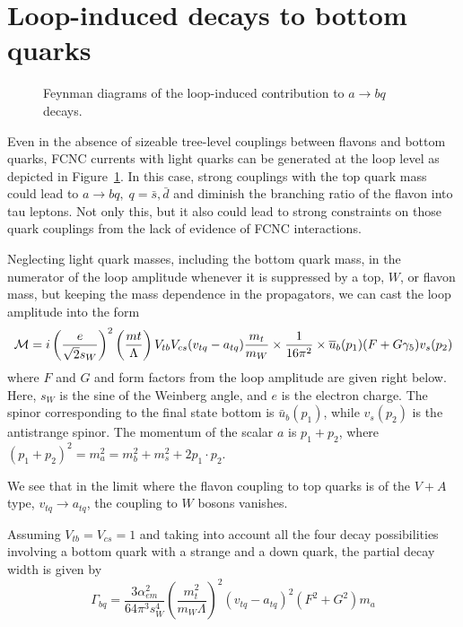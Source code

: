 \documentclass[prd,amsfonts,onecolumn,superscriptaddress,aps,nofootinbib,11pt]{revtex4-1}
\begin{document}
\section{Loop-induced decays to bottom quarks}
\label{app:loop}
\begin{figure}
    \centering
    
    \caption{Feynman diagrams of the loop-induced contribution to $a\to bq$ decays.}
    \label{fig:loop-tikz}
\end{figure}

 Even in the absence of sizeable tree-level couplings between flavons and bottom quarks, FCNC currents with light quarks can be generated at the loop level as depicted in Figure~\ref{fig:loop-tikz}. In this case, strong couplings with the top quark mass could lead to $a\to bq,\; q=\bar{s},\bar{d}$ and diminish the branching ratio of the flavon into tau leptons. Not only this, but it also could lead to strong constraints on those quark couplings from the lack of evidence of FCNC interactions. 

 Neglecting light quark masses, including the bottom quark mass, in the numerator of the loop amplitude whenever it is suppressed by a top, $W$, or flavon mass, but keeping the mass dependence in the propagators, we can cast the loop amplitude into the form
 \begin{equation}
     {\cal M} = i\left(\frac{e}{\sqrt{2} s_W}\right)^2\left(\frac{mt}{\Lambda}\right) V_{tb} V_{cs} (v_{tq}-a_{tq})\frac{m_t}{m_W}\times \frac{1}{16\pi^2}\times \overline{u}_b(p_1)(F+G\gamma_5)v_s(p_2)
 \end{equation}
 where $F$ and $G$ and form factors from the loop amplitude are given right below. Here, $s_W$ is the sine of the Weinberg angle, and $e$ is the electron charge. The spinor corresponding to the final state bottom is $\bar{u}_b(p_1)$, while $v_s(p_2)$ is the antistrange spinor. The momentum of the scalar $a$ is $p_1+p_2$, where $(p_1+p_2)^2=m_a^2=m_b^2+m_s^2+2p_1\cdot p_2$.

 We see that in the limit where the flavon coupling to top quarks is of the $V+A$ type, $v_{tq}\to a_{tq}$, the coupling to $W$ bosons vanishes. 

 Assuming $V_{tb}=V_{cs}=1$ and taking into account all the four decay possibilities involving a bottom quark with a strange and a down quark, the partial decay width is given by
 \begin{equation}
     \Gamma_{bq} = \frac{3\alpha_{em}^2}{64\pi^3 s_W^4}\left(\frac{m_t^2}{m_W \Lambda}\right)^2 (v_{tq}-a_{tq})^2(F^2+G^2) m_a
 \end{equation}
\end{document}
